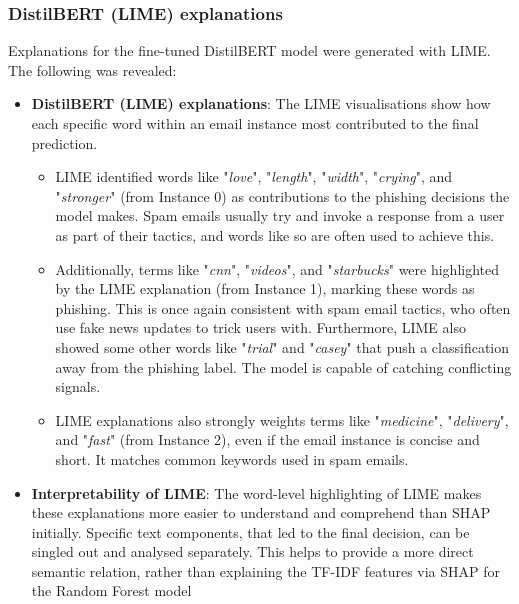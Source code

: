 
\subsubsection*{DistilBERT (LIME) explanations}
Explanations for the fine-tuned DistilBERT model were generated with LIME. The following was revealed:

\begin{itemize}
  \item \textbf{DistilBERT (LIME) explanations}: The LIME visualisations show how each specific word within an email instance most contributed to the final prediction.
  \begin{itemize}
    \item LIME identified words like "\textit{love}", "\textit{length}", "\textit{width}", "\textit{crying}", and "\textit{stronger}" (from Instance 0) as contributions to the phishing decisions the model makes. Spam emails usually try and invoke a response from a user as part of their tactics, and words like so are often used to achieve this.
    \item Additionally, terms like "\textit{cnn}", "\textit{videos}", and "\textit{starbucks}" were highlighted by the LIME explanation (from Instance 1), marking these words as phishing. This is once again consistent with spam email tactics, who often use fake news updates to trick users with. Furthermore, LIME also showed some other words like "\textit{trial}" and "\textit{casey}" that push a classification away from the phishing label. The model is capable of catching conflicting signals.
    \item LIME explanations also strongly weights terms like "\textit{medicine}", "\textit{delivery}", and "\textit{fast}" (from Instance 2), even if the email instance is concise and short. It matches common keywords used in spam emails.
  \end{itemize}
  \item \textbf{Interpretability of LIME}: The word-level highlighting of LIME makes these explanations more easier to understand and comprehend than SHAP initially. Specific text components, that led to the final decision, can be singled out and analysed separately. This helps to provide a more direct semantic relation, rather than explaining the TF-IDF features via SHAP for the Random Forest model
\end{itemize}
